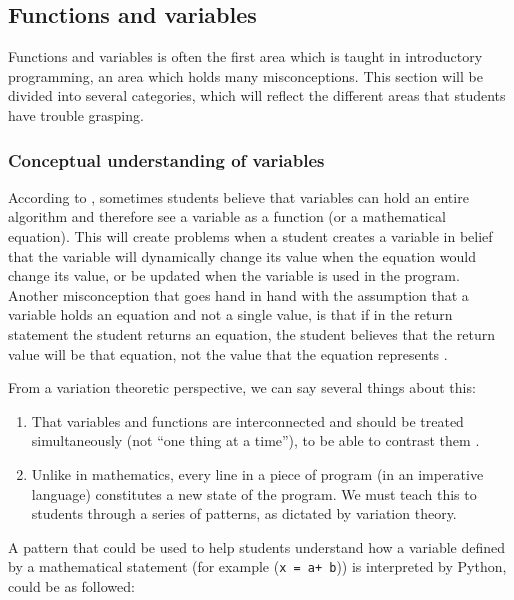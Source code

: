 \subsection{Functions and variables}

Functions and variables is often the first area which is taught in 
introductory programming, an area which holds many misconceptions. This 
section will be divided into several categories, which will reflect the 
different areas that students have trouble grasping.  


\subsubsection{Conceptual understanding of variables}
According to \textcite{
Kohn2017VariableEvaluation,Plass2015Variables,Doukakis2007}, 
sometimes students believe that variables can hold an entire algorithm and 
therefore see a variable as a function (or a mathematical equation). This 
will 
create problems when a student creates a variable in belief that the 
variable 
will dynamically change its value when the equation would change its value, 
or be updated
when the variable is used in the program. Another misconception that goes 
hand in hand with the assumption that a 
variable holds an equation and not a single value, is that if in the return 
statement the student returns an equation, the student believes that the 
return 
value will be that equation, not the value that the equation represents 
\parencite{Kohn2017VariableEvaluation}.

From a variation theoretic perspective, we can say several things about this:
\begin{enumerate}
  \item That variables and functions are interconnected and should be 
treated 
    simultaneously (not \enquote{one thing at a time}), to be able to 
contrast 
    them \parencite[\cf][Ch~6, pp~167--168]{NCOL}.
  \item Unlike in mathematics, every line in a piece of program (in an 
    imperative language) constitutes a new state of the program.
    We must teach this to students through a series of patterns, as 
dictated by 
    variation theory.
\end{enumerate}

A pattern that could be used to help students understand how a variable 
defined by a mathematical statement (for example (\texttt{x = a+
b})) is interpreted by Python, could be as followed:

